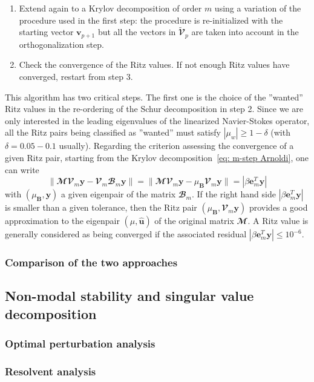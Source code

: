 \begin{enumerate}
      \item Extend again to a Krylov decomposition of order $m$ using a variation of the procedure used in the first step: the procedure is re-initialized with the starting vector ${\mathbf v}_{p+1}$ but all the vectors in $\tilde{\mathbfcal{V}}_p$ are taken into account in the orthogonalization step.

      \item Check the convergence of the Ritz values. If not enough Ritz values have converged, restart from step 3.

    \end{enumerate}
    This algorithm has two critical steps. The first one is the choice of the ''wanted'' Ritz values in the re-ordering of the Schur decomposition in step 2. Since we are only interested in the leading eigenvalues of the linearized Navier-Stokes operator, all the Ritz pairs being classified as ''wanted'' must satisfy $\left| \mu_w \right| \ge 1 - \delta$ (with $\delta = 0.05 - 0.1$ usually). Regarding the criterion assessing the convergence of a given Ritz pair, starting from the Krylov decomposition~\eqref{eq: m-step Arnoldi}, one can write
    \begin{equation}
      \| \mathbfcal{M} \mathbfcal{V}_m \mathbf{y} - \mathbfcal{V}_m \mathbfcal{B}_m \mathbf{y} \| = \| \mathbfcal{M} \mathbfcal{V}_m \mathbf{y} - \mu_{\mathbf B} \mathbfcal{V}_m \mathbf{y} \| = \left| \beta \mathbf{e}_m^T \mathbf{y} \right|
      \label{eq: Krylov convergence}
    \end{equation}
    with $(\mu_{\mathbf B},\mathbf{y})$ a given eigenpair of the matrix $\mathbfcal{B}_m$. If the right hand side $\left| \beta {\mathbf e}_{m}^T{\mathbf y} \right|$ is smaller than a given tolerance, then the Ritz pair $(\mu_{\mathbf B}, \mathbfcal{V}_m {\mathbf y})$ provides a good approximation to the eigenpair $(\mu, \hat{\mathbf u})$ of the original matrix $\mathbfcal{M}$. A Ritz value is generally considered as being converged if the associated residual $\left| \beta {\mathbf e}_{m}^T{\mathbf y} \right| \le 10^{-6}$.

    \subsubsection{Comparison of the two approaches}


  \subsection{Non-modal stability and singular value decomposition}

    \subsubsection{Optimal perturbation analysis}

    \subsubsection{Resolvent analysis}
